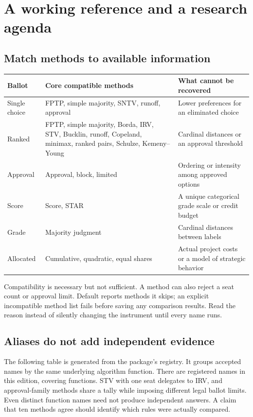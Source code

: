 \chapter{A working reference and a research agenda}
\label{chap:reference}
\section{Match methods to available information}
\begin{longtable}{p{.19\linewidth}p{.40\linewidth}p{.30\linewidth}}
\toprule Ballot & Core compatible methods & What cannot be recovered\\\midrule\endhead
Single choice & FPTP, simple majority, SNTV, runoff, approval & Lower preferences for an eliminated choice\\
Ranked & FPTP, simple majority, Borda, IRV, STV, Bucklin, runoff, Copeland, minimax, ranked pairs, Schulze, Kemeny--Young & Cardinal distances or an approval threshold\\
Approval & Approval, block, limited & Ordering or intensity among approved options\\
Score & Score, STAR & A unique categorical grade scale or credit budget\\
Grade & Majority judgment & Cardinal distances between labels\\
Allocated & Cumulative, quadratic, equal shares & Actual project costs or a model of strategic behavior\\
\bottomrule
\end{longtable}
Compatibility is necessary but not sufficient. A method can also reject a seat count or approval limit. Default  reports methods it skips; an explicit incompatible method list fails before saving any comparison results. Read the reason instead of silently changing the instrument until every name runs.

\section{Aliases do not add independent evidence}
The following table is generated from the package's registry. It groups accepted names by the same underlying algorithm function. There are \MethodNameCount{} registered names in this edition, covering \AlgorithmCount{} functions.
STV with one seat delegates to IRV, and approval-family methods share a tally while imposing different legal ballot limits. Even distinct function names need not produce independent answers. A claim that ten methods agree should identify which rules were actually compared.

